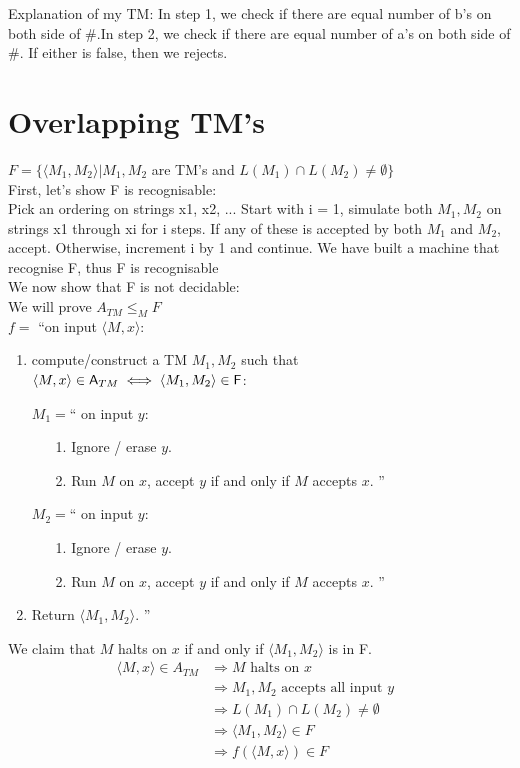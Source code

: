 \documentclass[12pt]{article}
\begin{document}
Explanation of my TM: In step 1, we check if there are equal number of b's on both side of $\#$.In step 2, we check if there are equal number of a's on both side of $\#$. If either is false, then we rejects.


\pagebreak
\section{Overlapping TM’s}

$F = \{\langle M_1, M_2\rangle | M_1, M_2 $ are TM's and $L(M_1) \cap L(M_2) \ne \emptyset \}$\\

First, let's show F is recognisable:\\
Pick an ordering on strings x1, x2, ... Start with i = 1, simulate both $M_1, M_2$ on strings x1 through xi for i steps. If any of these is accepted by both $M_1$ and $M_2$, accept. Otherwise, increment i by 1 and continue. We have built a machine that recognise F, thus F is recognisable\\


We now show that F is not decidable:\\
We will prove $ A_{TM} \le_M F$\\


$f=$ ``on input $\langle M,x\rangle$:
\begin{enumerate}
    \item compute/construct a TM $M_1, M_2$ such that $\langle M,x \rangle \in {\sf A}_{TM} \iff \langle M_1,M_2 \rangle \in  {\sf F}$:

$M_1=$`` on input $y$:
\vspace*{-10pt}
\begin{itemize}
\item[1.] Ignore / erase $y$.
\item[2.] Run $M$ on $x$, accept $y$ if and only if $M$ accepts $x$. ''
\end{itemize}
$M_2=$`` on input $y$:
\vspace*{-10pt}
\begin{itemize}
\item[1.] Ignore / erase $y$.
\item[2.] Run $M$ on $x$, accept $y$ if and only if $M$ accepts $x$. ''
\end{itemize}
\item Return $\langle M_1,M_2 \rangle$. ''
\end{enumerate}


We claim that $M$ halts on $x$ if and only if $\langle M_1,M_2\rangle$ is in F.
\begin{align*}
\langle M,x \rangle \in {A}_{TM} & \Rightarrow  M \textrm{ halts on $x$} \\ 
& \Rightarrow M_1,M_2 \textrm{ accepts all input $y$ } \\
& \Rightarrow   L(M_1) \cap L(M_2) \ne \emptyset \\
& \Rightarrow  \langle M_1, M_2\rangle \in F\\
& \Rightarrow  f(\langle M,x \rangle) \in F
\end{align*}
\end{document}
